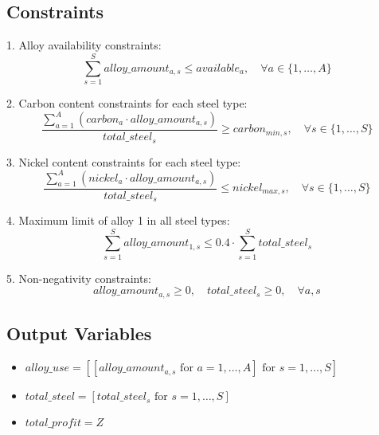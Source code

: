 \documentclass{article}
\begin{document}
\subsection*{Constraints}
1. Alloy availability constraints:
\[
\sum_{s=1}^{S} alloy\_amount_{a,s} \leq available_a, \quad \forall a \in \{1, \ldots, A\}
\]

2. Carbon content constraints for each steel type:
\[
\frac{\sum_{a=1}^{A} (carbon_{a} \cdot alloy\_amount_{a,s})}{total\_steel_{s}} \geq carbon_{min,s}, \quad \forall s \in \{1, \ldots, S\}
\]

3. Nickel content constraints for each steel type:
\[
\frac{\sum_{a=1}^{A} (nickel_{a} \cdot alloy\_amount_{a,s})}{total\_steel_{s}} \leq nickel_{max,s}, \quad \forall s \in \{1, \ldots, S\}
\]

4. Maximum limit of alloy 1 in all steel types:
\[
\sum_{s=1}^{S} alloy\_amount_{1,s} \leq 0.4 \cdot \sum_{s=1}^{S} total\_steel_{s}
\]

5. Non-negativity constraints:
\[
alloy\_amount_{a,s} \geq 0, \quad total\_steel_{s} \geq 0, \quad \forall a, s
\]

\subsection*{Output Variables}
\begin{itemize}
    \item \( alloy\_use = [[alloy\_amount_{a,s} \text{ for } a = 1, \ldots, A] \text{ for } s = 1, \ldots, S] \)
    \item \( total\_steel = [total\_steel_{s} \text{ for } s = 1, \ldots, S] \)
    \item \( total\_profit = Z \)
\end{itemize}
\end{document}

